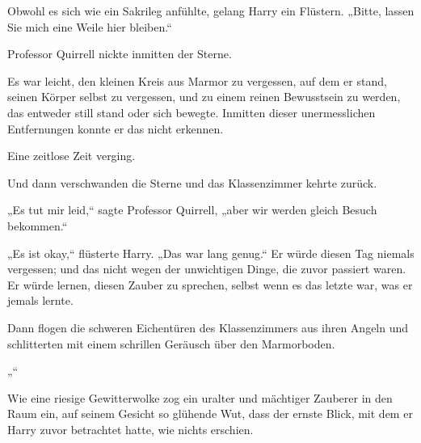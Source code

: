 Obwohl es sich wie ein Sakrileg anfühlte, gelang Harry ein Flüstern. „Bitte, lassen Sie mich eine Weile hier bleiben.“

Professor Quirrell nickte inmitten der Sterne.

Es war leicht, den kleinen Kreis aus Marmor zu vergessen, auf dem er stand, seinen Körper selbst zu vergessen, und zu einem reinen Bewusstsein zu werden, das entweder still stand oder sich bewegte. Inmitten dieser unermesslichen Entfernungen konnte er das nicht erkennen.

Eine zeitlose Zeit verging.

Und dann verschwanden die Sterne und das Klassenzimmer kehrte zurück.

„Es tut mir leid,“ sagte Professor Quirrell, „aber wir werden gleich Besuch bekommen.“

„Es ist okay,“ flüsterte Harry. „Das war lang genug.“ Er würde diesen Tag niemals vergessen; und das nicht wegen der unwichtigen Dinge, die zuvor passiert waren. Er würde lernen, diesen Zauber zu sprechen, selbst wenn es das letzte war, was er jemals lernte.

Dann flogen die schweren Eichentüren des Klassenzimmers aus ihren Angeln und schlitterten mit einem schrillen Geräusch über den Marmorboden.

„“

Wie eine riesige Gewitterwolke zog ein uralter und mächtiger Zauberer in den Raum ein, auf seinem Gesicht so glühende Wut, dass der ernste Blick, mit dem er Harry zuvor betrachtet hatte, wie nichts erschien.


